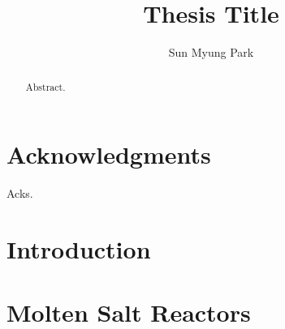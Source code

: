\documentclass[edeposit,fullpage,12pt]{uiucthesis2018}
\title{Thesis Title}
\author{Sun Myung Park}
\begin{document}
\maketitle

\frontmatter
\begin{abstract}

Abstract.

\end{abstract}

\chapter*{Acknowledgments}

Acks.


\tableofcontents
\listoftables
\listoffigures

\printglossary[title=List of Abbreviations,type=\acronymtype,nonumberlist,
nogroupskip=true]

\pagebreak
\mainmatter
\glsresetall

\chapter{Introduction}


\chapter{Molten Salt Reactors}


%
\end{document}
